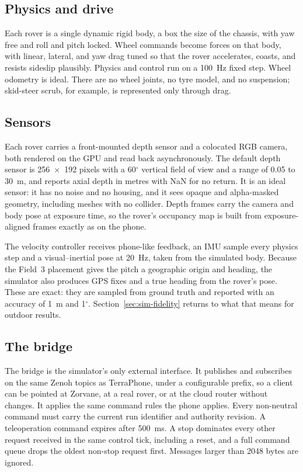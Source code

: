 \subsection{Physics and drive}

Each rover is a single dynamic rigid body, a box the size of the chassis, with yaw free and roll and pitch locked.
Wheel commands become forces on that body, with linear, lateral, and yaw drag tuned so that the rover accelerates, coasts, and resists sideslip plausibly.
Physics and control run on a 100~Hz fixed step.
Wheel odometry is ideal.
There are no wheel joints, no tyre model, and no suspension; skid-steer scrub, for example, is represented only through drag.

\subsection{Sensors}

Each rover carries a front-mounted depth sensor and a colocated RGB camera, both rendered on the GPU and read back asynchronously.
The default depth sensor is 256~$\times$~192 pixels with a 60$^\circ$ vertical field of view and a range of 0.05 to 30~m, and reports axial depth in metres with NaN for no return.
It is an ideal sensor: it has no noise and no housing, and it sees opaque and alpha-masked geometry, including meshes with no collider.
Depth frames carry the camera and body pose at exposure time, so the rover's occupancy map is built from exposure-aligned frames exactly as on the phone.

The velocity controller receives phone-like feedback, an IMU sample every physics step and a visual--inertial pose at 20~Hz, taken from the simulated body.
Because the Field~3 placement gives the pitch a geographic origin and heading, the simulator also produces GPS fixes and a true heading from the rover's pose.
These are exact: they are sampled from ground truth and reported with an accuracy of 1~m and 1$^\circ$.
Section~\ref{sec:sim-fidelity} returns to what that means for outdoor results.

\subsection{The bridge}

The bridge is the simulator's only external interface.
It publishes and subscribes on the same Zenoh topics as TerraPhone, under a configurable prefix, so a client can be pointed at Zorvane, at a real rover, or at the cloud router without changes.
It applies the same command rules the phone applies.
Every non-neutral command must carry the current run identifier and authority revision.
A teleoperation command expires after 500~ms.
A stop dominates every other request received in the same control tick, including a reset, and a full command queue drops the oldest non-stop request first.
Messages larger than 2048 bytes are ignored.

